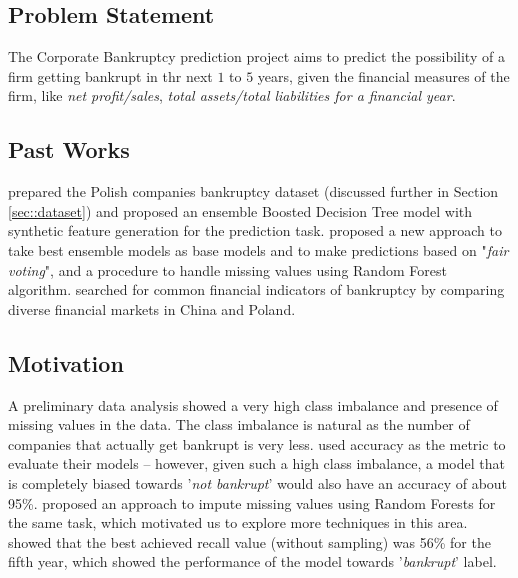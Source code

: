 \documentclass[11pt,a4paper]{article}
\begin{document}
\subsection{Problem Statement}
The Corporate Bankruptcy prediction project aims to predict the possibility of a firm getting bankrupt in thr next $1$ to $5$ years, given the financial measures of the firm, like \textit{net profit/sales}, \textit{total assets/total liabilities for a financial year}.

\subsection{Past Works}
 prepared the Polish companies bankruptcy dataset (discussed further in Section \ref{sec::dataset}) and proposed an ensemble Boosted Decision Tree model with synthetic feature generation for the prediction task.
 proposed a new approach to take best ensemble models as base models and to make predictions based on "\textit{fair voting}", and a procedure to handle missing values using Random Forest algorithm.
 searched for common financial indicators of bankruptcy by comparing diverse financial markets in China and Poland.


\subsection{Motivation}
\label{sec::motivation}
A preliminary data analysis showed a very high class imbalance and presence of missing values in the data. The class imbalance is natural as the number of companies that actually get bankrupt is very less.
 used accuracy as the metric to evaluate their models -- however, given such a high class imbalance, a model that is completely biased towards '\textit{not bankrupt}' would also have an accuracy of about 95\%.
 proposed an approach to impute missing values using Random Forests for the same task, which motivated us to explore more techniques in this area.
 showed that the best achieved recall value (without sampling) was 56\% for the fifth year, which showed the performance of the model towards '\textit{bankrupt}' label.
 
\end{document}
